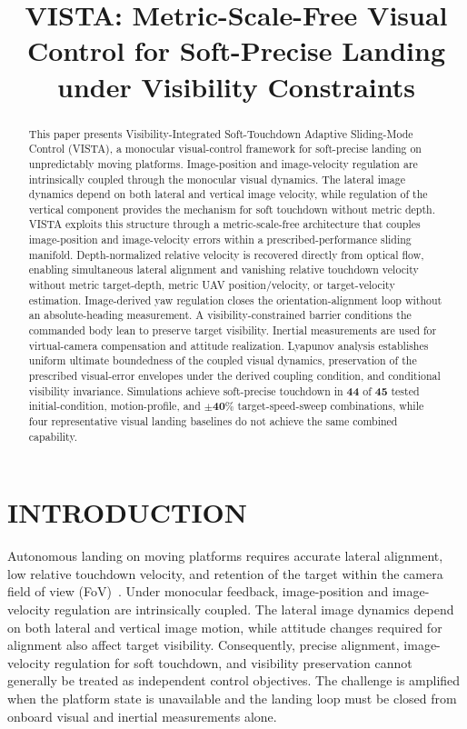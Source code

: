 \documentclass[10pt,conference]{IEEEtran}
\begin{document}
\title{VISTA: Metric-Scale-Free Visual Control for Soft-Precise Landing under Visibility Constraints}

\maketitle
\begin{abstract}
This paper presents Visibility-Integrated Soft-Touchdown Adaptive Sliding-Mode Control (VISTA), a monocular visual-control framework for soft-precise landing on unpredictably moving platforms. Image-position and image-velocity regulation are intrinsically coupled through the monocular visual dynamics. The lateral image dynamics depend on both lateral and vertical image velocity, while regulation of the vertical component provides the mechanism for soft touchdown without metric depth. VISTA exploits this structure through a metric-scale-free architecture that couples image-position and image-velocity errors within a prescribed-performance sliding manifold. Depth-normalized relative velocity is recovered directly from optical flow, enabling simultaneous lateral alignment and vanishing relative touchdown velocity without metric target-depth, metric UAV position/velocity, or target-velocity estimation. Image-derived yaw regulation closes the orientation-alignment loop without an absolute-heading measurement. A visibility-constrained barrier conditions the commanded body lean to preserve target visibility. Inertial measurements are used for virtual-camera compensation and attitude realization. Lyapunov analysis establishes uniform ultimate boundedness of the coupled visual dynamics, preservation of the prescribed visual-error envelopes under the derived coupling condition, and conditional visibility invariance. Simulations achieve soft-precise touchdown in $\boldsymbol{44}$ of $\boldsymbol{45}$ tested initial-condition, motion-profile, and $\boldsymbol{\pm40\%}$ target-speed-sweep combinations, while four representative visual landing baselines do not achieve the same combined capability.
\end{abstract}

\section{INTRODUCTION}
\label{intro: section}

Autonomous landing on moving platforms requires accurate lateral alignment, low relative touchdown velocity, and retention of the target within the camera field of view (FoV)~\cite{cho2022}. Under monocular feedback, image-position and image-velocity regulation are intrinsically coupled. The lateral image dynamics depend on both lateral and vertical image motion, while attitude changes required for alignment also affect target visibility. Consequently, precise alignment, image-velocity regulation for soft touchdown, and visibility preservation cannot generally be treated as independent control objectives. The challenge is amplified when the platform state is unavailable and the landing loop must be closed from onboard visual and inertial measurements alone.
\end{document}
